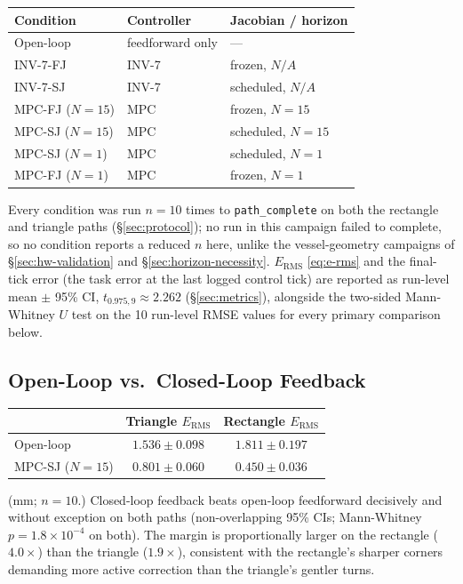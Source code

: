 \documentclass[journal]{IEEEtran}
\begin{document}
\begin{center}
\begin{tabular}{@{}lll@{}}
\toprule
Condition & Controller & Jacobian / horizon \\
\midrule
Open-loop & feedforward only & --- \\
INV-7-FJ & INV-7 & frozen, $N/A$ \\
INV-7-SJ & INV-7 & scheduled, $N/A$ \\
MPC-FJ ($N{=}15$) & MPC & frozen, $N{=}15$ \\
MPC-SJ ($N{=}15$) & MPC & scheduled, $N{=}15$ \\
MPC-SJ ($N{=}1$) & MPC & scheduled, $N{=}1$ \\
MPC-FJ ($N{=}1$) & MPC & frozen, $N{=}1$ \\
\bottomrule
\end{tabular}
\end{center}

Every condition was run $n=10$ times to \texttt{path\_complete} on both
the rectangle and triangle paths (\S\ref{sec:protocol}); no run in this
campaign failed to complete, so no condition reports a reduced $n$ here,
unlike the vessel-geometry campaigns of \S\ref{sec:hw-validation} and
\S\ref{sec:horizon-necessity}. $E_{\mathrm{RMS}}$ \eqref{eq:e-rms} and the
final-tick error (the task error at the last logged control tick) are
reported as run-level mean $\pm$ 95\% CI, $t_{0.975,9}\approx2.262$
(\S\ref{sec:metrics}), alongside the two-sided Mann-Whitney $U$ test on
the 10 run-level RMSE values for every primary comparison below.

\subsection{Open-Loop vs.\ Closed-Loop Feedback}
\label{sec:shape-exp1}

\begin{center}
\begin{tabular}{@{}lcc@{}}
\toprule
& Triangle $E_{\mathrm{RMS}}$ & Rectangle $E_{\mathrm{RMS}}$ \\
\midrule
Open-loop & $1.536\pm0.098$ & $1.811\pm0.197$ \\
MPC-SJ ($N{=}15$) & $0.801\pm0.060$ & $0.450\pm0.036$ \\
\bottomrule
\end{tabular}
\end{center}
(mm; $n=10$.) Closed-loop feedback beats open-loop feedforward
decisively and without exception on both paths (non-overlapping 95\%
CIs; Mann-Whitney $p=1.8\times10^{-4}$ on both). The margin is
proportionally larger on the rectangle ($4.0\times$) than the triangle
($1.9\times$), consistent with the rectangle's sharper corners
demanding more active correction than the triangle's gentler turns.
\end{document}
